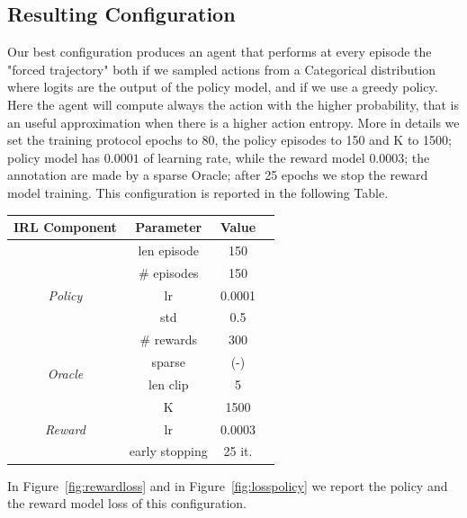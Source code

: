 \subsection{Resulting Configuration}

Our best configuration produces an agent that performs at every episode the "forced trajectory" both if we sampled actions from a Categorical distribution where logits are the output of the policy model, and if we use a greedy policy. Here the agent will compute always the action with the higher probability, that is an useful approximation when there is a higher action entropy. More in details we set the training protocol epochs to 80, the policy episodes to 150 and K to 1500; policy model has $0.0001$ of learning rate, while the reward model $0.0003$; the annotation are made by a sparse Oracle; after 25 epochs we stop the reward model training. This configuration is reported in the following Table.

\begin{table}[h!]
    \centering
    \begin{tabular}{ |c|c|c|c| } 
        \hline
        \textbf{IRL Component} & \textbf{Parameter} & \textbf{Value} \\
          \hline
          \multirow{5}{*}{\textit{Policy}} & len episode & 150 \\ 
          & \# episodes & 150 \\ 
          & lr  & 0.0001 \\ 
          & std  & 0.5 \\
          & \# rewards & 300 \\
          \hline
          \multirow{2}{*}{\textit{Oracle}} & sparse & (-) \\ 
          & len clip & 5 \\
          \hline
          \multirow{3}{*}{\textit{Reward}} & K & 1500 \\ 
          & lr & 0.0003 \\ 
          & early stopping & 25 it. \\ 
          \hline
    \end{tabular}
\end{table}

 In Figure\ \ref{fig:rewardloss} and in Figure\ \ref{fig:losspolicy} we report the policy and the reward model loss of this configuration.

